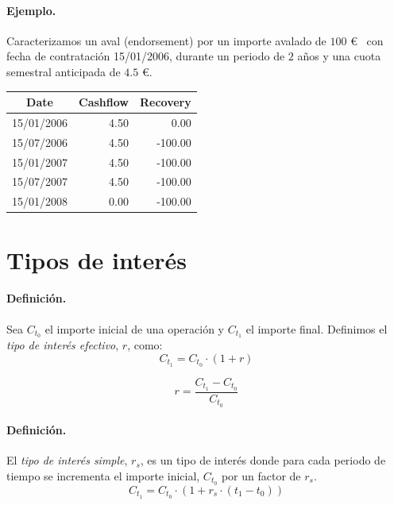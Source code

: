 \paragraph{Ejemplo.}
Caracterizamos un aval (endorsement) por un importe avalado de $100$ \euro~
con fecha de contrataci\'on 15/01/2006, durante un periodo de $2$ a\~nos y
una cuota semestral anticipada de $4.5$ \euro.

\begin{center}
\begin{tabular}{c|r|r}
\textbf{Date} & \textbf{Cashflow} & \textbf{Recovery} \\
\hline
15/01/2006 &     4.50 &    0.00 \\
15/07/2006 &     4.50 & -100.00 \\
15/01/2007 &     4.50 & -100.00 \\
15/07/2007 &     4.50 & -100.00 \\
15/01/2008 &     0.00 & -100.00
\end{tabular}
\end{center}



\section{Tipos de inter\'es}
\label{sec:interests}

\paragraph{Definici\'on.}
Sea $C_{t_0}$ el importe inicial de una operaci\'on y $C_{t_1}$ el importe final. 
Definimos el \emph{tipo de inter\'es efectivo}, $r$,
como:
\begin{equation}
C_{t_1} = C_{t_0} \cdot (1+r)
\end{equation}

\begin{equation}
\label{tipus_efectiu}
r = \frac{C_{t_1}-C_{t_0}}{C_{t_0}}
\end{equation}

\paragraph{Definici\'on.}
El \emph{tipo de inter\'es simple}, $r_s$, es un tipo
de inter\'es donde para cada periodo de tiempo se incrementa el importe inicial, $C_{t_0}$
por un factor de $r_s$.
\begin{equation}
C_{t_1} = C_{t_0} \cdot (1+ r_s \cdot (t_1-t_0))
\end{equation}

